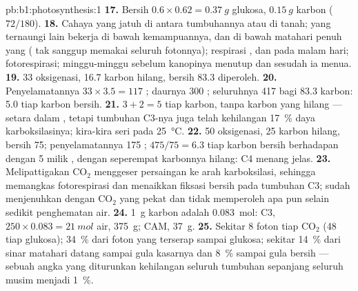 \begin{solution}{pb:b1:photosynthesis:1}
\textbf{17.} Bersih $0.6\times 0.62 = \qty{0.37}{g}$ glukosa,
$\qty{0.15}{g}$ karbon ($72/180$).
\textbf{18.} Cahaya yang jatuh di antara tumbuhannya atau di tanah;
 yang ternaungi  lain bekerja di bawah kemampuannya, dan 
di bawah matahari penuh yang  ( tak sanggup memakai seluruh
fotonnya); respirasi ,  dan pada malam hari; fotorespirasi;
minggu-minggu sebelum kanopinya menutup dan sesudah ia menua.
\textbf{19.} 33 oksigenasi, 16.7 karbon hilang, bersih 83.3 diperoleh.
\textbf{20.} Penyelamatannya $33\times 3.5 = 117$ ; daurnya 300 ;
seluruhnya 417  bagi 83.3 karbon: 5.0  tiap karbon bersih.
\textbf{21.} $3 + 2 = 5$  tiap karbon, tanpa karbon yang hilang ---
setara dalam , tetapi tumbuhan C3-nya juga telah kehilangan
\qty{17}{\%} daya karboksilasinya; kira-kira seri pada
\qty{25}{\celsius}.
\textbf{22.} 50 oksigenasi, 25 karbon hilang, bersih 75;
penyelamatannya 175 ; $475/75 = 6.3$  tiap karbon bersih
berhadapan dengan 5 milik , dengan seperempat karbonnya
hilang: C4 menang jelas.
\textbf{23.} Melipattigakan $\mathrm{CO_2}$ menggeser persaingan
 ke arah karboksilasi, sehingga memangkas fotorespirasi dan
menaikkan fiksasi bersih pada tumbuhan C3;  sudah
menjenuhkan  dengan $\mathrm{CO_2}$ yang pekat dan tidak
memperoleh apa pun selain sedikit penghematan air.
\textbf{24.} \qty{1}{g} karbon adalah \qty{0.083}{mol}: C3, $250\times 0.083 = \qty{21}{mol}$ air, \qty{375}{g}; CAM, \qty{37}{g}.
\textbf{25.} Sekitar 8 foton tiap $\mathrm{CO_2}$ (48 tiap glukosa);
\qty{34}{\%} dari foton yang terserap sampai glukosa; sekitar
\qty{14}{\%} dari sinar matahari datang sampai gula kasarnya dan
\qty{8}{\%} sampai gula bersih  --- sebuah angka yang diturunkan
kehilangan seluruh tumbuhan sepanjang seluruh musim menjadi \qty{1}{\%}.
\end{solution}
